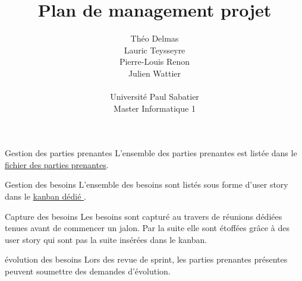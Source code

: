 \documentclass[]{article}
\title{Plan de management projet}
\author{
    Théo Delmas\\
    Lauric Teysseyre\\
    Pierre-Louis Renon\\
    Julien Wattier\\
    \\
    Université Paul Sabatier\\
    Master Informatique 1\\
   }
\date{}
\begin{document}
\maketitle
\newpage
\tableofcontents
\newpage

\begin{section}{Gestion des parties prenantes}
 L'ensemble des parties prenantes est listée dans le \href{../Parties_prenantes/Parties_prenantes.pdf}{fichier des parties prenantes}.

\end{section}

\begin{section}{Gestion des besoins}
 L'ensemble des besoins sont listés sous forme d'user story dans le \href{https://wekan.flopedt.org/b/HsRkBw5rbmQt5PQet/catalogue}{kanban dédié }.

 \begin{subsection}{Capture des besoins}
     Les besoins sont capturé au travers de réunions dédiées tenues avant de commencer un jalon.
     Par la suite elle sont étoffées grâce à des user story qui sont pas la suite insérées dans le kanban.
 \end{subsection}

 \begin{subsection}{évolution des besoins}
    Lors des revue de sprint, les parties prenantes présentes peuvent soumettre des demandes d'évolution.

 \end{subsection}

\end{section}
\end{document}
